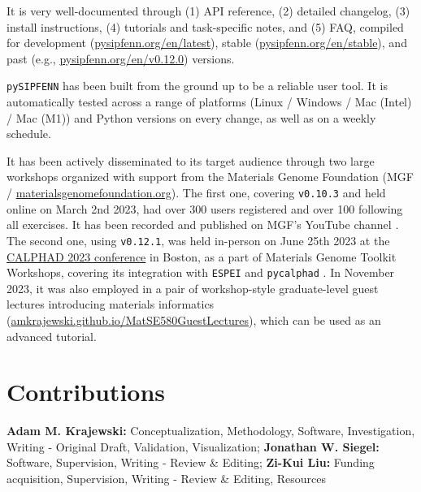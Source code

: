 It is very well-documented through (1) API reference, (2) detailed changelog, (3) install instructions, (4) tutorials and task-specific notes, and (5) FAQ, compiled for development (\href{https://pysipfenn.org/en/latest/}{pysipfenn.org/en/latest}), stable (\href{https://pysipfenn.org/en/stable/}{pysipfenn.org/en/stable}), and past (e.g., \href{https://pysipfenn.org/en/v0.12.0/}{pysipfenn.org/en/v0.12.0}) versions.

\texttt{pySIPFENN} has been built from the ground up to be a reliable user tool. It is automatically tested across a range of platforms (Linux / Windows / Mac (Intel) / Mac (M1)) and Python versions on every change, as well as on a weekly schedule.

It has been actively disseminated to its target audience through two large workshops organized with support from the Materials Genome Foundation (MGF / \href{https://materialsgenomefoundation.org}{materialsgenomefoundation.org}). The first one, covering \texttt{v0.10.3} and held online on March 2nd 2023, had over 300 users registered and over 100 following all exercises. It has been recorded and published on MGF's YouTube channel \cite{Krajewski20232023YouTube}. The second one, using \texttt{v0.12.1}, was held in-person on June 25th 2023 at the \href{https://calphad.org/calphad-2023}{CALPHAD 2023 conference} in Boston, as a part of Materials Genome Toolkit Workshops, covering its integration with \texttt{ESPEI} \cite{Bocklund2019ESPEICuMg} and \texttt{pycalphad} \cite{Otis2017Pycalphad:Python}. In November 2023, it was also employed in a pair of workshop-style graduate-level guest lectures introducing materials informatics (\href{https://amkrajewski.github.io/MatSE580GuestLectures/}{amkrajewski.github.io/MatSE580GuestLectures}), which can be used as an advanced tutorial.


\section*{Contributions}
\textbf{Adam M. Krajewski:} Conceptualization, Methodology, Software, Investigation, Writing - Original Draft, Validation, Visualization;
\textbf{Jonathan W. Siegel:} Software, Supervision, Writing - Review \& Editing;
\textbf{Zi-Kui Liu:} Funding acquisition, Supervision, Writing - Review \& Editing, Resources


\printbibliography[heading=subbibintoc]


